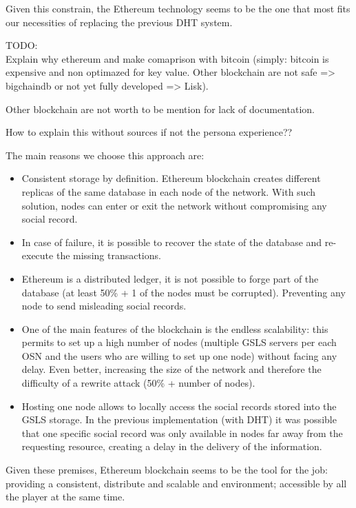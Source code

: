 Given this constrain, the Ethereum technology seems to be the one that most fits our necessities of replacing the previous DHT system.

\begin{notation}
  TODO: \\
  Explain why ethereum and make comaprison with bitcoin (simply: bitcoin is expensive and non optimazed for key value. Other blockchain are not safe => bigchaindb or not yet fully developed => Lisk).

  Other blockchain are not worth to be mention for lack of documentation.

  How to explain this without sources if not the persona experience??
\end{notation}
The main reasons we choose this approach are:

\begin{itemize}
  \item Consistent storage by definition. Ethereum blockchain creates different replicas of the same database in each node of the network. With such solution, nodes can enter or exit the network without compromising any social record.
  \item In case of failure, it is possible to recover the state of the database and re-execute the missing transactions.
  \item Ethereum is a distributed ledger, it is not possible to forge part of the database (at least 50\% + 1 of the nodes must be corrupted). Preventing any node to send misleading social records.
  \item One of the main features of the blockchain is the endless scalability: this permits to set up a high number of nodes (multiple GSLS servers per each OSN and the users who are willing to set up one node) without facing any delay.
  Even better, increasing the size of the network and therefore the difficulty of a rewrite attack (50\% + number of nodes).
  \item Hosting one node allows to locally access the social records stored into the GSLS storage. In the previous implementation (with DHT) it was possible that one specific social record was only available in nodes far away from the requesting resource, creating a delay in the delivery of the information. 
\end{itemize}

Given these premises, Ethereum blockchain seems to be the tool for the job: providing a consistent, distribute and scalable and environment; accessible by all the player at the same time.


